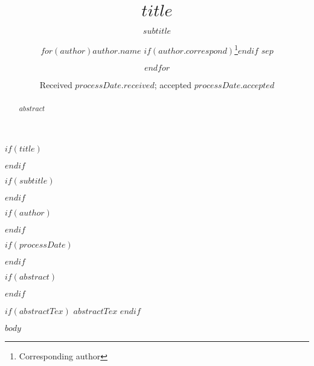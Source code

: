 \documentclass{aa}
\begin{document}
$if(title)$
  \title{$title$}
$endif$

$if(subtitle)$
  \subtitle{$subtitle$}
$endif$

$if(author)$

  \author{$for(author)$$author.name$
         $if(author.correspond)$\fnmsep\thanks{Corresponding author}$endif$
         $sep$\and $endfor$}

$endif$

$if(processDate)$
  \date{Received $processDate.received$; accepted $processDate.accepted$}
$endif$


$if(abstract)$
\begin{abstract}
  $abstract$
\end{abstract}
$endif$

$if(abstractTex)$
 $abstractTex$
$endif$


   \maketitle
%

$body$
\end{document}
